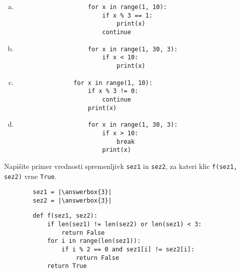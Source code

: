 \documentclass[arhiv, 10pt]{../izpit}
\newcommand{\inlinepy}[1]{\texttt{#1}}
\newcommand{\answerbox}[1]{\framebox{\vphantom{\large M}\hspace{#1cm}}}
\begin{document}
        \begin{multicols}{2}
        \begin{enumerate}[(a)]
\item 
                \begin{verbatim}
                    for x in range(1, 10):
                        if x % 3 == 1:
                            print(x)
                        continue
                \end{verbatim}
            
\item 
                \begin{verbatim}
                    for x in range(1, 30, 3):
                        if x < 10:
                            print(x)
                \end{verbatim}
            
\item 
            \begin{verbatim}
                for x in range(1, 10):
                    if x % 3 != 0:
                        continue
                    print(x)
            \end{verbatim}
        
\item 
                \begin{verbatim}
                    for x in range(1, 30, 3):
                        if x > 10:
                            break
                        print(x)
                \end{verbatim}
            
\end{enumerate}

        \end{multicols}
    
        \naloga*
        \begin{multicols}{2}
        \noindent
        Napišite primer vrednosti spremenljivk \inlinepy{sez1} in \inlinepy{sez2}, za kateri klic \inlinepy{f(sez1, sez2)} vrne \inlinepy{True}.
        \begin{verbatim}
        sez1 = |\answerbox{3}|
        sez2 = |\answerbox{3}|
        \end{verbatim}
        \vfil
        \columnbreak
        \begin{verbatim}
        def f(sez1, sez2):
            if len(sez1) != len(sez2) or len(sez1) < 3:
                return False
            for i in range(len(sez1)):
                if i % 2 == 0 and sez1[i] != sez2[i]:
                    return False
            return True
        \end{verbatim}
        \end{multicols}
    
\end{document}
